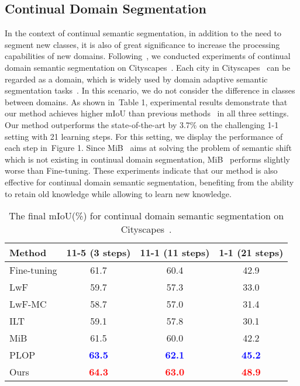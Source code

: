 \documentclass[10pt,twocolumn,letterpaper]{article}
\newcommand{\figref}[1]{Figure 1}\newcommand{\tabref}[1]{Table 1}\newcommand{\secref}[1]{Section 1}
\newcommand{\figref}[1]{Fig.~\ref{#1}}\newcommand{\tabref}[1]{Tab.~\ref{#1}}\newcommand{\secref}[1]{Sec.~\ref{#1}}
\begin{document}
\subsection{Continual Domain Segmentation}
In the context of continual semantic segmentation,
in addition to the need to segment new classes,
it is also of great significance to increase the processing capabilities
of new domains.
Following~\cite{plop},
we conducted experiments of continual domain semantic segmentation
on Cityscapes~\cite{cordts2016cityscapes}.
Each city in Cityscapes~\cite{cordts2016cityscapes} can be regarded
as a domain, which is widely used by domain adaptive semantic segmentation
tasks~\cite{chen2017no}.
In this scenario,
we do not consider the difference in classes between domains.
As shown in~\tabref{tab:cityscapes},
experimental results demonstrate that
our method achieves higher mIoU than previous methods~\cite{ilt,mib,plop}
in all three settings.
Our method outperforms the state-of-the-art by 3.7\% on the challenging 1-1 setting
with 21 learning steps.
For this setting,
we display the performance of each step in~\figref{fig:all-cityscapes}.
Since MiB~\cite{mib} aims at solving the problem of semantic shift which is not existing in continual domain segmentation,
MiB~\cite{mib} performs slightly worse than Fine-tuning.
These experiments indicate that our method is also effective for continual domain semantic segmentation,
benefiting from the ability to retain old knowledge while allowing to learn new knowledge.

\begin{table}[t]
\centering
\small
\setlength{\tabcolsep}{1pt} \begin{tabular}{l|c||c||c}
\toprule
\textbf{Method}       & \textbf{11-5} (3 steps) & \textbf{11-1} (11 steps) & \textbf{1-1} (21 steps)  \\ \hline
Fine-tuning    & 61.7  & 60.4  & 42.9 \\
LwF~\cite{li2017learning} & 59.7 & 57.3 & 33.0 \\
LwF-MC~\cite{rebuffi2017icarl} & 58.7 & 57.0 & 31.4 \\
ILT~\cite{ilt}  & 59.1 & 57.8 & 30.1 \\
MiB~\cite{mib}   & 61.5 & 60.0 & 42.2 \\
PLOP~\cite{plop}  & \textcolor{blue}{\bf{63.5}} & \textcolor{blue}{\bf{62.1}} & \textcolor{blue}{\bf{45.2}} \\
Ours & \textcolor{red}{\bf{64.3}} & \textcolor{red}{\bf{63.0}} & \textcolor{red}{\bf{48.9}} \\
\bottomrule
\end{tabular}
\caption{The final mIoU(\%) for continual domain semantic segmentation on Cityscapes~\cite{cordts2016cityscapes}.}\label{tab:cityscapes}
\end{table} 
\end{document}

